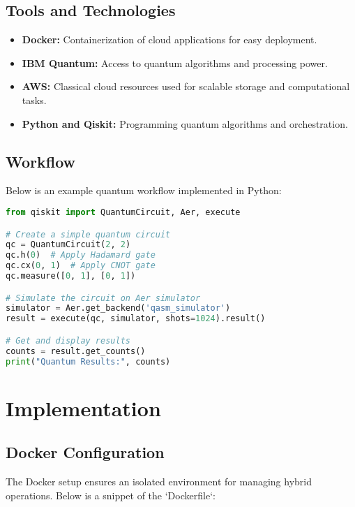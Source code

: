 \documentclass[12pt,a4paper]{article}
\begin{document}
\subsection{Tools and Technologies}
\begin{itemize}
    \item \textbf{Docker:} Containerization of cloud applications for easy deployment.
    \item \textbf{IBM Quantum:} Access to quantum algorithms and processing power.
    \item \textbf{AWS:} Classical cloud resources used for scalable storage and computational tasks.
    \item \textbf{Python and Qiskit:} Programming quantum algorithms and orchestration.
\end{itemize}

\subsection{Workflow}
Below is an example quantum workflow implemented in Python:

\begin{tcolorbox}[title=Quantum Circuit Example, colback=gray!5!white, colframe=blue!75!black]
\begin{lstlisting}[language=Python]
from qiskit import QuantumCircuit, Aer, execute

# Create a simple quantum circuit
qc = QuantumCircuit(2, 2)
qc.h(0)  # Apply Hadamard gate
qc.cx(0, 1)  # Apply CNOT gate
qc.measure([0, 1], [0, 1])

# Simulate the circuit on Aer simulator
simulator = Aer.get_backend('qasm_simulator')
result = execute(qc, simulator, shots=1024).result()

# Get and display results
counts = result.get_counts()
print("Quantum Results:", counts)
\end{lstlisting}
\end{tcolorbox}

\section{Implementation}
\subsection{Docker Configuration}
The Docker setup ensures an isolated environment for managing hybrid operations. Below is a snippet of the `Dockerfile`:
\end{document}
